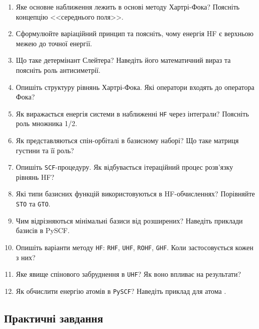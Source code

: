 \begin{enumerate}
    \item Яке основне наближення лежить в основі методу Хартрі-Фока? Поясніть концепцію <<середнього поля>>.
    \item Сформулюйте варіаційний принцип та поясніть, чому енергія HF є верхньою межею до точної енергії.
    \item Що таке детермінант Слейтера? Наведіть його математичний вираз та поясніть роль антисиметрії.
    \item Опишіть структуру рівнянь Хартрі-Фока. Які оператори входять до оператора Фока?
    \item Як виражається енергія системи в наближенні \texttt{HF} через інтеграли? Поясніть роль множника 1/2.
    \item Як представляються спін-орбіталі в базисному наборі? Що таке матриця густини та її роль?
    \item Опишіть \texttt{SCF}-процедуру. Як відбувається ітераційний процес розв'язку рівнянь HF?
    \item Які типи базисних функцій використовуються в HF-обчисленнях? Порівняйте \texttt{STO} та \texttt{GTO}.
    \item Чим відрізняються мінімальні базиси від розширених? Наведіть приклади базисів в PySCF.
    \item Опишіть варіанти методу \texttt{HF}: \texttt{RHF}, \texttt{UHF}, \texttt{ROHF}, \texttt{GHF}. Коли застосовується кожен з них?
    \item Яке явище спінового забруднення в \texttt{UHF}? Як воно впливає на результати?
    \item Як обчислити енергію атомів в \texttt{PySCF}? Наведіть приклад для атома .
\end{enumerate}

\subsection*{Практичні завдання}

